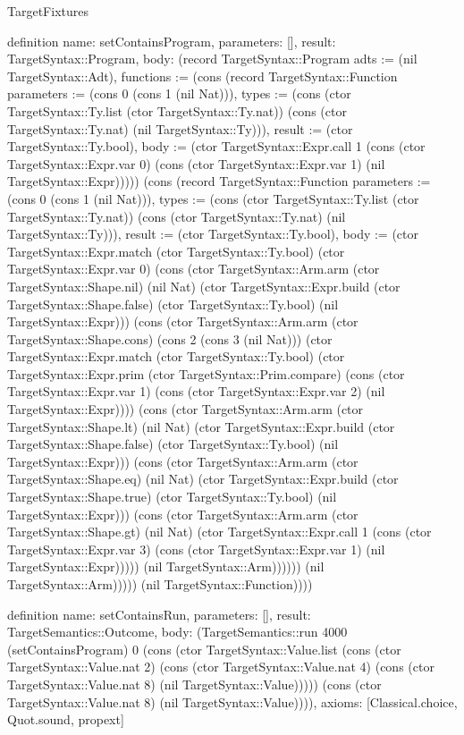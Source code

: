 \begin{lexlean}{TargetFixtures}
\begin{semanticmodule}
definition{
  name: setContainsProgram,
  parameters: [],
  result: TargetSyntax::Program,
  body: (record TargetSyntax::Program {adts := (nil TargetSyntax::Adt), functions := (cons (record TargetSyntax::Function {parameters := (cons 0 (cons 1 (nil Nat))), types := (cons (ctor TargetSyntax::Ty.list (ctor TargetSyntax::Ty.nat)) (cons (ctor TargetSyntax::Ty.nat) (nil TargetSyntax::Ty))), result := (ctor TargetSyntax::Ty.bool), body := (ctor TargetSyntax::Expr.call 1 (cons (ctor TargetSyntax::Expr.var 0) (cons (ctor TargetSyntax::Expr.var 1) (nil TargetSyntax::Expr))))}) (cons (record TargetSyntax::Function {parameters := (cons 0 (cons 1 (nil Nat))), types := (cons (ctor TargetSyntax::Ty.list (ctor TargetSyntax::Ty.nat)) (cons (ctor TargetSyntax::Ty.nat) (nil TargetSyntax::Ty))), result := (ctor TargetSyntax::Ty.bool), body := (ctor TargetSyntax::Expr.match (ctor TargetSyntax::Ty.bool) (ctor TargetSyntax::Expr.var 0) (cons (ctor TargetSyntax::Arm.arm (ctor TargetSyntax::Shape.nil) (nil Nat) (ctor TargetSyntax::Expr.build (ctor TargetSyntax::Shape.false) (ctor TargetSyntax::Ty.bool) (nil TargetSyntax::Expr))) (cons (ctor TargetSyntax::Arm.arm (ctor TargetSyntax::Shape.cons) (cons 2 (cons 3 (nil Nat))) (ctor TargetSyntax::Expr.match (ctor TargetSyntax::Ty.bool) (ctor TargetSyntax::Expr.prim (ctor TargetSyntax::Prim.compare) (cons (ctor TargetSyntax::Expr.var 1) (cons (ctor TargetSyntax::Expr.var 2) (nil TargetSyntax::Expr)))) (cons (ctor TargetSyntax::Arm.arm (ctor TargetSyntax::Shape.lt) (nil Nat) (ctor TargetSyntax::Expr.build (ctor TargetSyntax::Shape.false) (ctor TargetSyntax::Ty.bool) (nil TargetSyntax::Expr))) (cons (ctor TargetSyntax::Arm.arm (ctor TargetSyntax::Shape.eq) (nil Nat) (ctor TargetSyntax::Expr.build (ctor TargetSyntax::Shape.true) (ctor TargetSyntax::Ty.bool) (nil TargetSyntax::Expr))) (cons (ctor TargetSyntax::Arm.arm (ctor TargetSyntax::Shape.gt) (nil Nat) (ctor TargetSyntax::Expr.call 1 (cons (ctor TargetSyntax::Expr.var 3) (cons (ctor TargetSyntax::Expr.var 1) (nil TargetSyntax::Expr))))) (nil TargetSyntax::Arm)))))) (nil TargetSyntax::Arm))))}) (nil TargetSyntax::Function)))})
}

definition{
  name: setContainsRun,
  parameters: [],
  result: TargetSemantics::Outcome,
  body: (TargetSemantics::run 4000 (setContainsProgram) 0 (cons (ctor TargetSyntax::Value.list (cons (ctor TargetSyntax::Value.nat 2) (cons (ctor TargetSyntax::Value.nat 4) (cons (ctor TargetSyntax::Value.nat 8) (nil TargetSyntax::Value))))) (cons (ctor TargetSyntax::Value.nat 8) (nil TargetSyntax::Value)))),
  axioms: [Classical.choice, Quot.sound, propext]
}


\end{semanticmodule}
\end{lexlean}
